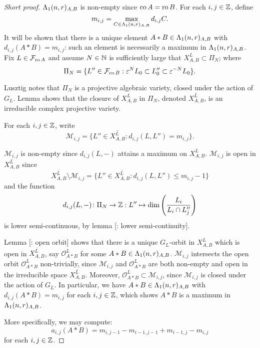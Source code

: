 \documentclass[a4paper, 11pt]{report}
\begin{document}
\begin{proof}[Short proof]
$\Lambda_1(n,r)_{A,B}$ is non-empty since $\operatorname{co}{A}=\operatorname{ro}{B}$. For each $i,j\in\mathbb{Z}$, define
\begin{equation*}
m_{i,j} = \max_{C\in\Lambda_1(n,r)_{A,B}} d_{i,j}C.
\end{equation*}
It will be shown that there is a unique element $A\ast B\in \Lambda_1(n,r)_{A,B}$ with $d_{i,j}(A\ast B) = m_{i,j}$: such an element is necessarily a maximum in $\Lambda_1(n,r)_{A,B}$. Fix $L\in\mathcal{F}_{\operatorname{ro}{A}}$ and assume $N\in\mathbb{N}$ is sufficiently large that $X_{A,B}^L\subset \Pi_N$; where
\begin{equation*}
\Pi_N = \{L''\in\mathcal{F}_{\operatorname{co}{B}}: \varepsilon^N L_0\subset L_0''\subset \varepsilon^{-N} L_0\}.
\end{equation*}

Lusztig notes \cite{lusztig99} that $\Pi_N$ is a projective algebraic variety, closed under the action of $G_L$. Lemma \needsreference shows that the closure of $X_{A,B}^L$ in $\Pi_N$, denoted $\overline{X_{A,B}^L}$, is an irreducible complex projective variety.

For each $i,j\in\mathbb{Z}$, write
\begin{equation*}
\mathcal{M}_{i,j} = \{L''\in\overline{X_{A,B}^L}: d_{i,j}(L,L'') = m_{i,j}\}.
\end{equation*}

$\mathcal{M}_{i,j}$ is non-empty since $d_{i,j}(L,-)$ attains a maximum on $X_{A,B}^L$. $\mathcal{M}_{i,j}$ is open in $\overline{X_{A,B}^L}$ since
\begin{equation*}
\overline{X_{A,B}^L}\setminus \mathcal{M}_{i,j} = \{L''\in\overline{X_{A,B}^L}: d_{i,j}(L,L'')\le m_{i,j} - 1\}
\end{equation*}
and the function
\begin{equation*}
d_{i,j}(L,-)\colon\Pi_N\to\mathbb{Z} : L''\mapsto \dim\left(\frac{L_i}{L_i\cap L_j''}\right)
\end{equation*}
is lower semi-continuous, by lemma [\needsreference : lower semi-continuity].

Lemma [\needsreference : open orbit] shows that there is a unique $G_L$-orbit in $X_{A,B}^L$ which is open in $\overline{X_{A,B}^L}$, say $\mathcal{O}_{A\ast B}^L$ for some $A\ast B\in\Lambda_1(n,r)_{A,B}$. $\mathcal{M}_{i,j}$ intersects the open orbit $\mathcal{O}_{A\ast B}^L$ non-trivially, since $\mathcal{M}_{i,j}$ and $\mathcal{O}_{A\ast B}^L$ are both non-empty and open in the irreducible space $\overline{X_{A,B}^L}$. Moreover, $\mathcal{O}_{A\ast B}^L\subset \mathcal{M}_{i,j}$, since $\mathcal{M}_{i,j}$ is closed under the action of $G_L$. In particular, we have $A\ast B\in \Lambda_1(n,r)_{A,B}$ with $d_{i,j}(A\ast B) = m_{i,j}$ for each $i,j\in\mathbb{Z}$, which shows $A\ast B$ is a maximum in $\Lambda_1(n,r)_{A,B}$.

More specifically, we may compute:
\begin{equation*}
a_{i,j}(A\ast B) = m_{i,j-1} - m_{i-1,j-1} + m_{i-1,j} - m_{i,j}
\end{equation*}
for each $i,j\in\mathbb{Z}$.
\end{proof}
\end{document}
